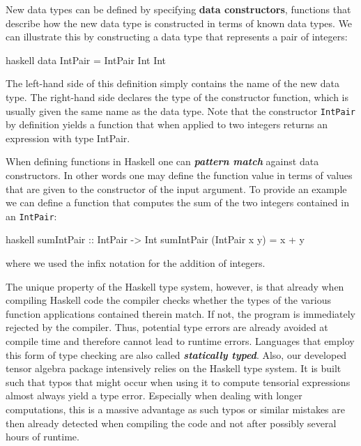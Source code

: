 New data types can be defined by specifying \textbf{\textbf{data constructors}}, functions that describe how the new data type is constructed in terms of known data types. We can illustrate this by constructing a data type that represents a pair of integers:
\begin{center}
\begin{cminted}{haskell}
data IntPair = IntPair Int Int 
\end{cminted}
\end{center}
The left-hand side of this definition simply contains the name of the new data type. The right-hand side declares the type of the constructor function, which is usually given the same name as the data type. 
Note that the constructor \texttt{IntPair} by definition yields a function that when applied to two integers returns an expression with type IntPair. 

When defining functions in Haskell one can \textbf{\textit{pattern match}} against data constructors. In other words one may define the function value in terms of values that are given to the constructor of the input argument. To provide an example we can define a function that computes the sum of the two integers contained in an \texttt{IntPair}:
\begin{center}
\begin{cminted}{haskell}
sumIntPair :: IntPair -> Int 
sumIntPair (IntPair x y) = x + y
\end{cminted}
\end{center}
where we used the infix notation for the addition of integers. 

The unique property of the Haskell type system, however, is that already when compiling Haskell code the compiler checks whether the types of the various function applications contained therein match. If not, the program is immediately rejected by the compiler. Thus, potential type errors are already avoided at compile time and therefore cannot lead to runtime errors. Languages that employ this form of type checking are also called \textit{\textbf{statically typed}}. Also, our developed tensor algebra package intensively relies on the Haskell type system. It is built such that typos that might occur when using it to compute tensorial expressions almost always yield a type error. Especially when dealing with longer computations, this is a massive advantage as such typos or similar mistakes are then already detected when compiling the code and not after possibly several hours of runtime.  

